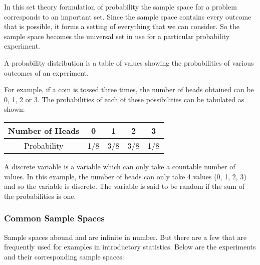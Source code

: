\documentclass[12pt]{article}
\begin{document}
In this set theory formulation of probability the sample space for a problem corresponds to an important set. Since the sample space contains every outcome that is possible, it forms a setting of everything that we can consider. So the sample space becomes the universal set in use for a particular probability experiment.

A probability distribution is a table of values showing the probabilities of various outcomes of an experiment.

For example, if a coin is tossed three times, the number of heads obtained can be 0, 1, 2 or 3. The probabilities of each of these possibilities can be tabulated as shown:

\begin{tabular}{|c|c|c|c|c|}
\hline Number of Heads & 0 & 1 & 2 & 3 \\ 
\hline Probability & 1/8  & 3/8  & 3/8 & 1/8 \\ 
\hline 
\end{tabular} 

A discrete variable is a variable which can only take a countable number of values. In this example, the number of heads can only take 4 values (0, 1, 2, 3) and so the variable is discrete. The variable is said to be random if the sum of the probabilities is one. 


\subsubsection{Common Sample Spaces}

Sample spaces abound and are infinite in number. But there are a few that are frequently used for examples in introductory statistics. Below are the experiments and their corresponding sample spaces:
\end{document}
